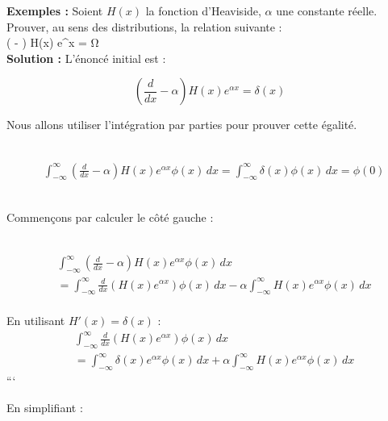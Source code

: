 \documentclass{beamer}
\begin{document}
\begin{frame}
\textbf{Exemples :}
    Soient \( H(x) \) la fonction d'Heaviside, \( \alpha \)  une constante réelle. Prouver, au sens des distributions, la relation suivante :
\\
\vspace{0.3cm} 
  \hspace{2cm}\left( - \alpha\right) H(x) e^{\alpha x} = \delta
\vspace{0.3cm} Ω
\\
  \textbf{Solution :}
L'énoncé initial est :

\[ \left(\frac{d}{dx} - \alpha\right) H(x) e^{\alpha x} = \delta(x) \]

Nous allons utiliser l'intégration par parties pour prouver cette égalité.

\\
\begin{align*}
&\int_{-\infty}^{\infty} \left(\frac{d}{dx} - \alpha\right) H(x) e^{\alpha x} \phi(x) \,dx = \int_{-\infty}^{\infty} \delta(x) \phi(x) \,dx = \phi(0)
\end{align*}
\\
\end{frame}
\begin{frame}

Commençons par calculer le côté gauche :

\\
\begin{align*}
&\int_{-\infty}^{\infty} \left(\frac{d}{dx} - \alpha\right) H(x) e^{\alpha x} \phi(x) \,dx \\
&= \int_{-\infty}^{\infty} \frac{d}{dx}\left(H(x) e^{\alpha x}\right) \phi(x) \,dx - \alpha \int_{-\infty}^{\infty} H(x) e^{\alpha x} \phi(x) \,dx
\end{align*}
\\


En utilisant \(H'(x) = \delta(x)\) :
\\

\begin{align*}
&\int_{-\infty}^{\infty} \frac{d}{dx}\left(H(x) e^{\alpha x}\right) \phi(x) \,dx \\
&= \int_{-\infty}^{\infty} \delta(x) e^{\alpha x} \phi(x) \,dx + \alpha \int_{-\infty}^{\infty} H(x) e^{\alpha x} \phi(x) \,dx
\end{align*}```

En simplifiant :
\end{frame}
\end{document}
